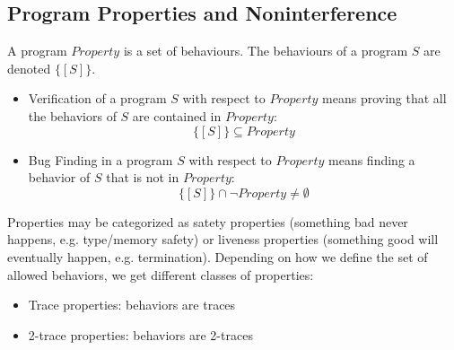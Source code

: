 \documentclass[10pt,a4paper]{report}
\begin{document}
\subsection{Program Properties and Noninterference}
A program $Property$ is a set of behaviours. The behaviours of a program $S$ are denoted $\{[S]\}$.
\begin{itemize}
\item Verification of a program $S$ with respect to $Property$ means proving that all the behaviors of $S$ are contained in $Property$:
$$
\{[S]\} \subseteq Property
$$
\item Bug Finding in a program $S$ with respect to $Property$ means finding a behavior of $S$ that is not in $Property$:
$$
\{[S]\} \cap \neg Property \neq \emptyset
$$
\end{itemize}
Properties may be categorized as satety properties (something bad never happens, e.g. type/memory safety) or liveness properties (something good will eventually happen, e.g. termination).
Depending on how we define the set of allowed behaviors, we get different classes of properties:
\begin{itemize}
\item Trace properties: behaviors are traces
\item 2-trace properties: behaviors are 2-traces
\end{itemize}
\end{document}
